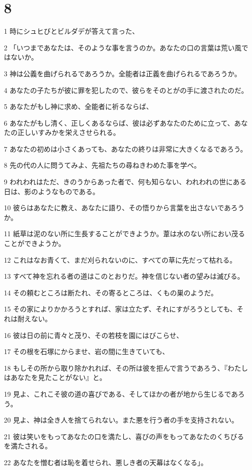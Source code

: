 \chapter{8}

\par 1 時にシュヒびとビルダデが答えて言った、
\par 2 「いつまであなたは、そのような事を言うのか。あなたの口の言葉は荒い風ではないか。
\par 3 神は公義を曲げられるであろうか。全能者は正義を曲げられるであろうか。
\par 4 あなたの子たちが彼に罪を犯したので、彼らをそのとがの手に渡されたのだ。
\par 5 あなたがもし神に求め、全能者に祈るならば、
\par 6 あなたがもし清く、正しくあるならば、彼は必ずあなたのために立って、あなたの正しいすみかを栄えさせられる。
\par 7 あなたの初めは小さくあっても、あなたの終りは非常に大きくなるであろう。
\par 8 先の代の人に問うてみよ、先祖たちの尋ねきわめた事を学べ。
\par 9 われわれはただ、きのうからあった者で、何も知らない、われわれの世にある日は、影のようなものである。
\par 10 彼らはあなたに教え、あなたに語り、その悟りから言葉を出さないであろうか。
\par 11 紙草は泥のない所に生長することができようか。葦は水のない所におい茂ることができようか。
\par 12 これはなお青くて、まだ刈られないのに、すべての草に先だって枯れる。
\par 13 すべて神を忘れる者の道はこのとおりだ。神を信じない者の望みは滅びる。
\par 14 その頼むところは断たれ、その寄るところは、くもの巣のようだ。
\par 15 その家によりかかろうとすれば、家は立たず、それにすがろうとしても、それは耐えない。
\par 16 彼は日の前に青々と茂り、その若枝を園にはびこらせ、
\par 17 その根を石塚にからませ、岩の間に生きていても、
\par 18 もしその所から取り除かれれば、その所は彼を拒んで言うであろう、『わたしはあなたを見たことがない』と。
\par 19 見よ、これこそ彼の道の喜びである、そしてほかの者が地から生じるであろう。
\par 20 見よ、神は全き人を捨てられない。また悪を行う者の手を支持されない。
\par 21 彼は笑いをもってあなたの口を満たし、喜びの声をもってあなたのくちびるを満たされる。
\par 22 あなたを憎む者は恥を着せられ、悪しき者の天幕はなくなる」。

